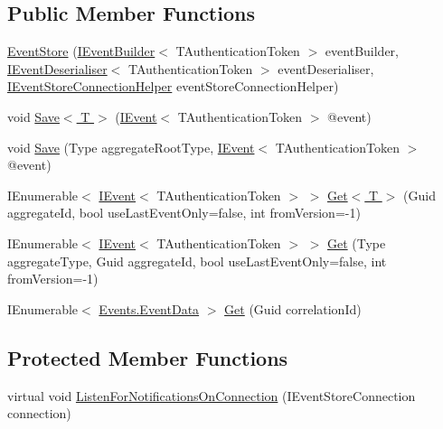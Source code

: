 \subsection*{Public Member Functions}
\begin{DoxyCompactItemize}
\item 
\hyperlink{classCqrs_1_1EventStore_1_1EventStore_ab48ad2c9d72780ae3a662e213498f194_ab48ad2c9d72780ae3a662e213498f194}{Event\+Store} (\hyperlink{interfaceCqrs_1_1EventStore_1_1IEventBuilder}{I\+Event\+Builder}$<$ T\+Authentication\+Token $>$ event\+Builder, \hyperlink{interfaceCqrs_1_1EventStore_1_1IEventDeserialiser}{I\+Event\+Deserialiser}$<$ T\+Authentication\+Token $>$ event\+Deserialiser, \hyperlink{interfaceCqrs_1_1EventStore_1_1IEventStoreConnectionHelper}{I\+Event\+Store\+Connection\+Helper} event\+Store\+Connection\+Helper)
\item 
void \hyperlink{classCqrs_1_1EventStore_1_1EventStore_a7261e5b74f55ef7afd23144c155ba116_a7261e5b74f55ef7afd23144c155ba116}{Save$<$ T $>$} (\hyperlink{interfaceCqrs_1_1Events_1_1IEvent}{I\+Event}$<$ T\+Authentication\+Token $>$ @event)
\item 
void \hyperlink{classCqrs_1_1EventStore_1_1EventStore_adce33037e2a3eb81cfccded42ba2ed35_adce33037e2a3eb81cfccded42ba2ed35}{Save} (Type aggregate\+Root\+Type, \hyperlink{interfaceCqrs_1_1Events_1_1IEvent}{I\+Event}$<$ T\+Authentication\+Token $>$ @event)
\item 
I\+Enumerable$<$ \hyperlink{interfaceCqrs_1_1Events_1_1IEvent}{I\+Event}$<$ T\+Authentication\+Token $>$ $>$ \hyperlink{classCqrs_1_1EventStore_1_1EventStore_aaa4ebd61c84124425380ce31e3a67600_aaa4ebd61c84124425380ce31e3a67600}{Get$<$ T $>$} (Guid aggregate\+Id, bool use\+Last\+Event\+Only=false, int from\+Version=-\/1)
\item 
I\+Enumerable$<$ \hyperlink{interfaceCqrs_1_1Events_1_1IEvent}{I\+Event}$<$ T\+Authentication\+Token $>$ $>$ \hyperlink{classCqrs_1_1EventStore_1_1EventStore_a9d7b3a3ebcf110fe02d53e2ada19933d_a9d7b3a3ebcf110fe02d53e2ada19933d}{Get} (Type aggregate\+Type, Guid aggregate\+Id, bool use\+Last\+Event\+Only=false, int from\+Version=-\/1)
\item 
I\+Enumerable$<$ \hyperlink{classCqrs_1_1Events_1_1EventData}{Events.\+Event\+Data} $>$ \hyperlink{classCqrs_1_1EventStore_1_1EventStore_a898b51899af27db8aa0fb0c0dc75b25d_a898b51899af27db8aa0fb0c0dc75b25d}{Get} (Guid correlation\+Id)
\end{DoxyCompactItemize}
\subsection*{Protected Member Functions}
\begin{DoxyCompactItemize}
\item 
virtual void \hyperlink{classCqrs_1_1EventStore_1_1EventStore_add7396a800fe8f64c61406311e8fee1d_add7396a800fe8f64c61406311e8fee1d}{Listen\+For\+Notifications\+On\+Connection} (I\+Event\+Store\+Connection connection)
\end{DoxyCompactItemize}
